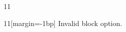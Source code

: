 \documentclass[paper=A4]{ropas-poster}
\begin{document}
\begin{postergrid}{1}{1}
\begin{posterblock}{1}{1}[margin=-1bp]
Invalid block option.
\end{posterblock}
\end{postergrid}
\end{document}
